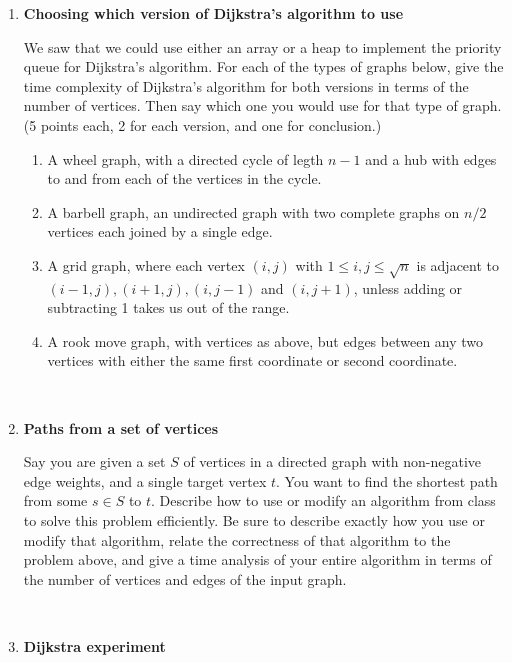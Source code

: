 \documentclass[12pt, letterpaper]{article}
\begin{document}
\begin{enumerate}
\begin{adjustwidth}{2em}{}
        Therefore, the total time complexity is $O(k\log k)$, with extra space $O(k)$.
        \end{adjustwidth}

\-\ \newpage
\item \textbf{Choosing which version of Dijkstra's algorithm to use}

We saw that we could use either an array or a heap to implement the priority queue for Dijkstra's
algorithm.  For each of the types of graphs below, give the time complexity of Dijkstra's algorithm for both versions in terms of the number of vertices.  Then say which one you would use for that type of graph.  
(5 points each, 2 for each version, and one for conclusion.)

\begin{enumerate}
\item A wheel graph, with a directed cycle of legth $n-1$ and a hub with edges
to and from each of the vertices in the cycle.
\item A barbell graph, an undirected graph with two complete graphs on $n/2$ vertices each joined by a single edge.
\item A grid graph, where each vertex $(i,j)$ with $1 \le i,j \le \sqrt{n}$ is
adjacent to $(i-1,j), (i+1,j), (i,j-1)$ and $(i,j+1)$, unless adding or subtracting 1 takes us out of the range. 
\item A rook move graph, with vertices as above, but edges between any two vertices with either the same first coordinate or second coordinate. 
\end{enumerate}

\-\ \newpage
\item \textbf{Paths from a set of vertices}

Say you are given a set $S$ of vertices in a directed graph with non-negative
edge weights, and a single target vertex $t$.  You want to find the shortest path from some $s \in S$ to $t$.
Describe how to use or modify an algorithm
from class to solve this problem efficiently. Be sure to describe exactly how you use or modify that algorithm, relate the correctness of that algorithm to the problem above, and give a time analysis of your entire algorithm in terms of the number of vertices and edges of the input graph.


\-\ \newpage
\item \textbf{Dijkstra experiment}


\end{enumerate}
\end{document}
